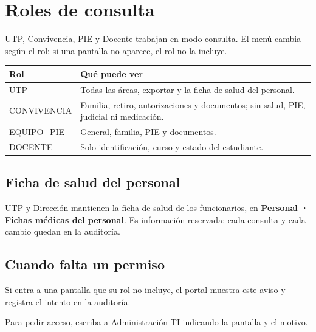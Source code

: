 \section{Roles de consulta}

UTP, Convivencia, PIE y Docente trabajan en modo consulta. El menú cambia
según el rol: si una pantalla no aparece, el rol no la incluye.


\begin{longtable}{@{}p{}p{}@{}}
\toprule
\textbf{Rol} & \textbf{Qué puede ver}\\
\midrule
UTP & Todas las áreas, exportar y la ficha de salud del personal.\\
CONVIVENCIA & Familia, retiro, autorizaciones y documentos; sin salud, PIE,
  judicial ni medicación.\\
EQUIPO\_PIE & General, familia, PIE y documentos.\\
DOCENTE & Solo identificación, curso y estado del estudiante.\\
\bottomrule
\end{longtable}

\subsection{Ficha de salud del personal}

UTP y Dirección mantienen la ficha de salud de los funcionarios, en
\textbf{Personal · Fichas médicas del personal}. Es información reservada: cada
consulta y cada cambio quedan en la auditoría.


\subsection{Cuando falta un permiso}

Si entra a una pantalla que su rol no incluye, el portal muestra este aviso y
registra el intento en la auditoría.


Para pedir acceso, escriba a Administración TI indicando la pantalla y el
motivo.
